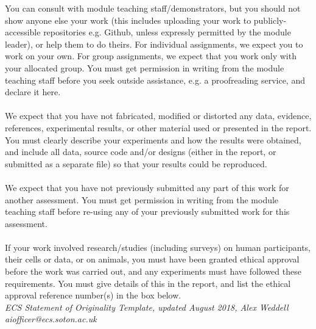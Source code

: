 \textrm{You can consult with module teaching staff/demonstrators, but you should not show anyone 
else your work (this includes uploading your work to publicly-accessible repositories e.g. 
Github, unless expressly permitted by the module leader), or help them to do theirs. For 
individual assignments, we expect you to work on your own. For group assignments, we 
expect that you work only with your allocated group. You must get permission in writing 
from the module teaching staff before you seek outside assistance, e.g. a proofreading service, 
and declare it here.} \\
 \\ 

\textrm{We expect that you have not fabricated, modified or distorted any data, evidence, references, 
experimental results, or other material used or presented in the report. You must clearly 
describe your experiments and how the results were obtained, and include all data, source 
code and/or designs (either in the report, or submitted as a separate file) so that your results 
could be reproduced.} \\
 \\ 

\textrm{We expect that you have not previously submitted any part of this work for another 
assessment. You must get permission in writing from the module teaching staff before re-using any of your previously submitted work for this assessment.} \\
 \\ 

\textrm{If your work involved research/studies (including surveys) on human participants, their cells 
or data, or on animals, you must have been granted ethical approval before the work was 
carried out, and any experiments must have followed these requirements. You must give 
details of this in the report, and list the ethical approval reference number(s) in the box below.} \\
\textrm{\textit{ECS Statement of Originality Template, updated August 2018, Alex Weddell 
aiofficer@ecs.soton.ac.uk}}